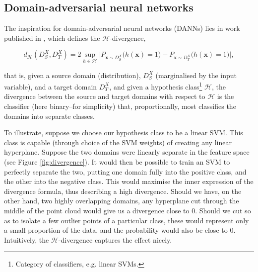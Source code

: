 \subsection{Domain-adversarial neural networks}
\label{subsubsec:adversarial_notes}


The inspiration for domain-adversarial neural networks (DANNs) lies in work published in \cite{ben2010theory}, which defines the $\mathcal{H}$-divergence,

\begin{equation}
d_\mathcal{H}(D_S^X, D_T^X) = 2\sup_{h \in \mathcal{H}}\Big|P_{\mathbf{x} \sim D_S^X}\big(h(\mathbf{x})= 1\big) - P_{\mathbf{x} \sim D_T^X}\big(h(\mathbf{x}) = 1\big)\Big|,
\end{equation}

that is, given a source domain (distribution), $D_S^X$ (marginalised by the input variable), and a target domain $D_T^X$, and given a hypothesis class\footnote{Category of classifiers, e.g. linear SVMs.} $\mathcal{H}$, the divergence between the source and target domains with respect to $\mathcal{H}$ is the classifier (here binary--for simplicity) that, proportionally, most classifies the domains into separate classes.

To illustrate, suppose we choose our hypothesis class to be a linear SVM. This class is capable (through choice of the SVM weights) of creating any linear hyperplane. Suppose the two domains were linearly separate in the feature space (see Figure \ref{fig:divergence}). It would then be possible to train an SVM to perfectly separate the two, putting one domain fully into the positive class, and the other into the negative class. This would maximise the inner expression of the divergence formula, thus describing a high divergence. Should we have, on the other hand, two highly overlapping domains, any hyperplane cut through the middle of the point cloud would give us a divergence close to $0$. Should we cut so as to isolate a few outlier points of a particular class, these would represent only a small proportion of the data, and the probability would also be close to $0$. Intuitively, the $\mathcal{H}$-divergence captures the effect nicely.

